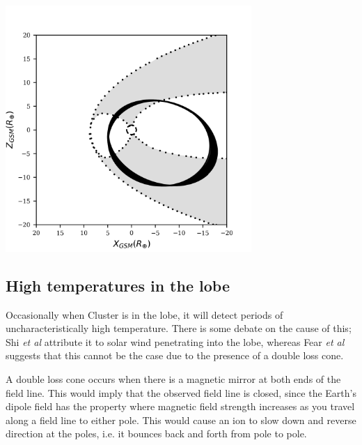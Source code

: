 \documentclass{article}
\newenvironment{Figure}
  {\par\medskip\noindent\minipage{\linewidth}}
  {\endminipage\par\medskip}
\begin{document}
\begin{Figure}
    \begin{minipage}[c]{0.57\textwidth}
        \centering
        \includegraphics[width=0.7\textwidth]{sc_pos_09_05_coloured.png}
    \end{minipage}\hfill
    \begin{minipage}[c]{0.4\textwidth}
        \label{fig:ClusterPos}
    \end{minipage}
\end{Figure}

\subsection{High temperatures in the lobe}
Occasionally when Cluster is in the lobe, it will detect periods of uncharacteristically high temperature. There is some debate on the cause of this; Shi \textit{et al} \cite{Shi2013} attribute it to solar wind penetrating into the lobe, whereas Fear \textit{et al} \cite{Fear1506} suggests that this cannot be the case due to the presence of a double loss cone. 

A double loss cone occurs when there is a magnetic mirror at both ends of the field line. This would imply that the observed field line is closed, since the Earth's dipole field has the property where magnetic field strength increases as you travel along a field line to either pole. This would cause an ion to slow down and reverse direction at the poles, i.e. it bounces back and forth from pole to pole.
\end{document}
